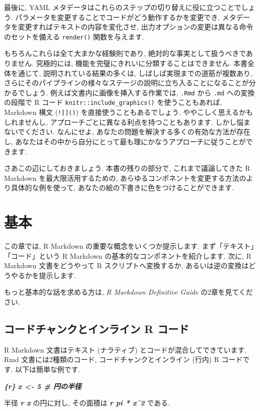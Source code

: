 \documentclass[
  11pt,
  lualatex,ja=standard,jafont=noto]{bxjsreport}
\newenvironment{Shaded}{\begin{snugshade}}{\end{snugshade}}
\newcommand{\InformationTok}[1]{\textcolor[rgb]{0.56,0.35,0.01}{\textbf{\textit{#1}}}}
\newcommand{\NormalTok}[1]{#1}
\begin{document}
最後に, YAML メタデータはこれらのステップの切り替えに役に立つことでしょう. パラメータを変更することでコードがどう動作するかを変更でき, メタデータを変更すればテキストの内容を変化させ, 出力オプションの変更は異なる命令のセットを備える \texttt{render()} 関数を与えます.

もちろんこれらは全て大まかな経験則であり, 絶対的な事実として扱うべきでありません. 究極的には, 機能を完璧にきれいに分類することはできません. 本書全体を通じて, 説明されている結果の多くは, しばしば実現までの道筋が複数あり, さらにそのパイプラインの様々なステージの説明に立ち入ることになることが分かるでしょう. 例えば文書内に画像を挿入する作業では, \texttt{.Rmd} から \texttt{.md} への変換の段階で R コード \texttt{knitr::include\_graphics()} を使うこともあれば, Markdown 構文 (\texttt{!{[}{]}()}) を直接使うこともあるでしょう. ややこしく思えるかもしれませんし, アプローチごとに異なる利点を持つこともあります. しかし悩まないでください. なんにせよ, あなたの問題を解決する多くの有効な方法が存在し, あなたはその中から自分にとって最も理にかなうアプローチに従うことができます.

さあこの辺にしておきましょう. 本書の残りの部分で, これまで議論してきた R Markdown を最大限活用するための, あらゆるコンポネントを変更する方法のより具体的な例を使って, あなたの絵の下書きに色をつけることができます.

\hypertarget{basics}{%
\chapter{基本}\label{basics}}

この章では, R Markdown の重要な概念をいくつか提示します. まず「テキスト」「コード」という R Markdown の基本的なコンポネントを紹介します. 次に, R Markdown 文書をどうやって R スクリプトへ変換するか, あるいは逆の変換はどうやるかを提示します.

もっと基本的な話を求める方は, \emph{R Markdown Definitive Guide} \autocite{rmarkdown2018} の2章を見てください.

\hypertarget{r-code}{%
\section{コードチャンクとインライン R コード}\label{r-code}}

R Markdown 文書はテキスト (ナラティブ) とコードが混合してできています. Rmd 文書には2種類のコード, コードチャンクとインライン (行内) R コードです. 以下は簡単な例です.

\begin{Shaded}
\begin{Highlighting}[]
\InformationTok{\textasciigrave{}\textasciigrave{}\textasciigrave{}\{r\}}
\InformationTok{x \textless{}{-} 5  \# 円の半径}
\InformationTok{\textasciigrave{}\textasciigrave{}\textasciigrave{}}

\NormalTok{半径 }\InformationTok{\textasciigrave{}r x\textasciigrave{}}\NormalTok{ の円に対し,}
\NormalTok{その面積は }\InformationTok{\textasciigrave{}r pi * x\^{}2\textasciigrave{}}\NormalTok{ である.}
\end{Highlighting}
\end{Shaded}
\end{document}
